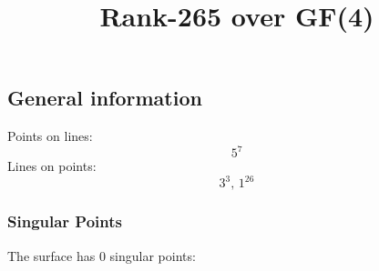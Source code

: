 \documentclass{article}
\newcommand\setTBstruts{\def\T{\rule{0pt}{2.6ex}}%
\def\B{\rule[-1.2ex]{0pt}{0pt}}}
\begin{document}
 
\setTBstruts



{\allowdisplaybreaks%






\title{Rank-265 over GF(4)}
\author{}%
\maketitle%
%
{}



\subsection*{General information}
Points on lines:
$$
5^7$$
Lines on points:
$$
3^3,\,1^{26}$$
\subsubsection*{Singular Points}
The surface has 0 singular points:\\
\begin{align*}
\end{align*}
}
\end{document}

